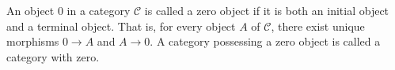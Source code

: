 An object $0$ in a category $\mathcal{C}$ is called a zero object if it is both an initial object and a terminal object. That is, for every object $A$ of $\mathcal{C}$, there exist unique morphisms $0 \to A$ and $A \to 0$. A category possessing a zero object is called a category with zero.
